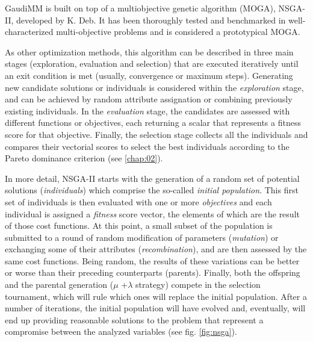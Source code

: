 GaudiMM is built on top of a multiobjective genetic algorithm (MOGA), NSGA-II, developed by K. Deb.\cite{nsgaii} It has been thoroughly tested and benchmarked in well-characterized multi-objective problems and is considered a prototypical MOGA.

As other optimization methods, this algorithm can be described in three main stages (exploration, evaluation and selection) that are executed iteratively until an exit condition is met (usually, convergence or maximum steps). Generating new candidate solutions or individuals is considered within the \textit{exploration} stage, and can be achieved by random attribute assignation or combining previously existing individuals. In the \textit{evaluation} stage, the candidates are assessed with different functions or objectives, each returning a scalar that represents a fitness score for that objective. Finally, the selection stage collects all the individuals and compares their vectorial scores to select the best individuals according to the Pareto dominance criterion (see \autoref{chap:02}).

In more detail, NSGA-II starts with the generation of a random set of potential solutions (\textit{individuals}) which comprise the so-called \textit{initial population}. This first set of individuals is then evaluated with one or more \textit{objectives} and each individual is assigned a \textit{fitness} score vector, the elements of which are the result of those cost functions. At this point, a small subset of the population is submitted to a round of random modification of parameters (\textit{mutation}) or exchanging some of their attributes (\textit{recombination}), and are then assessed by the same cost functions. Being random, the results of these variations can be better or worse than their preceding counterparts (parents). Finally, both the offspring and the parental generation ($ \mu $ +$ \lambda $ strategy) compete in the selection tournament, which will rule which ones will replace the initial population. After a number of iterations, the initial population will have evolved and, eventually, will end up providing reasonable solutions to the problem that represent a compromise between the analyzed variables (see fig. \ref{fig:nsga}).

